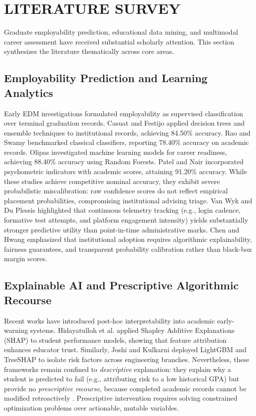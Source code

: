 \documentclass[conference]{IEEEtran}
\begin{document}
\section{LITERATURE SURVEY}

Graduate employability prediction, educational data mining, and multimodal career assessment have received substantial scholarly attention. This section synthesizes the literature thematically across core areas.

\subsection{Employability Prediction and Learning Analytics}
Early EDM investigations formulated employability as supervised classification over terminal graduation records. Casuat and Festijo \cite{b7} applied decision trees and ensemble techniques to institutional records, achieving 84.50\% accuracy. Rao and Swamy \cite{b8} benchmarked classical classifiers, reporting 78.40\% accuracy on academic records. Olipas \cite{b1} investigated machine learning models for career readiness, achieving 88.40\% accuracy using Random Forests. Patel and Nair \cite{b4} incorporated psychometric indicators with academic scores, attaining 91.20\% accuracy. While these studies achieve competitive nominal accuracy, they exhibit severe probabilistic miscalibration: raw confidence scores do not reflect empirical placement probabilities, compromising institutional advising triage. Van Wyk and Du Plessis \cite{b2} highlighted that continuous telemetry tracking (e.g., login cadence, formative test attempts, and platform engagement intensity) yields substantially stronger predictive utility than point-in-time administrative marks. Chen and Hwang \cite{b5} emphasized that institutional adoption requires algorithmic explainability, fairness guarantees, and transparent probability calibration rather than black-box margin scores.

\subsection{Explainable AI and Prescriptive Algorithmic Recourse}
Recent works have introduced post-hoc interpretability into academic early-warning systems. Hidayatulloh et al. \cite{b16} applied Shapley Additive Explanations (SHAP) to student performance models, showing that feature attribution enhances educator trust. Similarly, Joshi and Kulkarni \cite{b17} deployed LightGBM and TreeSHAP to isolate risk factors across engineering branches. Nevertheless, these frameworks remain confined to \textit{descriptive} explanation: they explain why a student is predicted to fail (e.g., attributing risk to a low historical GPA) but provide no \textit{prescriptive recourse}, because completed academic records cannot be modified retroactively \cite{b16,b17}. Prescriptive intervention requires solving constrained optimization problems over actionable, mutable variables.
\end{document}
